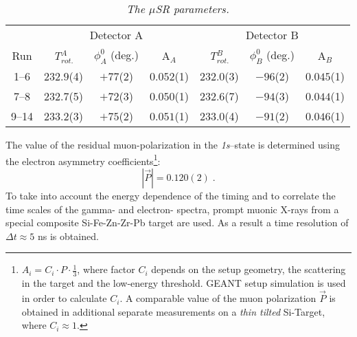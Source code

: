 \begin{table}[h]
\begin{center}
\caption{\it The $\mu$SR parameters.} \label{msrTable}
\begin{tabular}{|c|ccc|ccc|} \hline
 \multicolumn{1}{|c}{} &
 \multicolumn{3}{|c|}{Detector A} &
 \multicolumn{3}{c|}{Detector B} \\ \cline{2-7}
%
 \multicolumn{1}{|c|}{Run} &
 \multicolumn{1}{c}{\it T$_{rot.}^A$} (ns)  \hspace{3mm}&
 \multicolumn{1}{c}{$\phi _A^0$ (deg.) \hspace{3mm}} &
 \multicolumn{1}{c|}{A$_A$} &
 \multicolumn{1}{c}{\it T$_{rot.}^B$} (ns) \hspace{3mm} &
 \multicolumn{1}{c}{$\phi _B^0$ (deg.) \hspace{3mm} }  &
 \multicolumn{1}{c|}{A$_B$} \\ \hline
%
  1--6 & $232.9$(4) & $+77$(2)  & $0.052$(1)
       & $232.0$(3) & $-96$(2)  & $0.045$(1) \\ \hline
  7--8 & $232.7$(5) & $+72$(3)  & $0.050$(1)
       & $232.6$(7) & $-94$(3)  & $0.044$(1) \\ \hline
 9--14 & $233.2$(3) & $+75$(2)  & $0.051$(1)
       & $233.0$(4) & $-91$(2)  & $0.046$(1) \\ \hline
\end{tabular}
\end{center}
\end{table}

The value of the residual muon-polarization in the {\it1s}--state is
determined using
the electron asymmetry coefficients\footnote{$A_i = C_i \cdot P \cdot
\frac{1}{3}$,
where factor $C_i$ depends on the setup geometry, the scattering in the
target and the
low-energy threshold.
GEANT setup simulation  is used in order to 
calculate $C_i$. A comparable value of the muon polarization $\vec P$
 is obtained in additional separate 
measurements on a {\em thin tilted} Si-Target, where $C_i \approx 1$.}:
\begin{equation}
  |\vec{P}| = 0.120(2) \; .
\end{equation}
To take into account the energy dependence of the timing and
to correlate the time scales of the gamma- and electron- spectra,
prompt muonic X-rays from a special composite Si-Fe-Zn-Zr-Pb
target are used. As a result a time
resolution of $\Delta t \approx 5$ ns is obtained.

